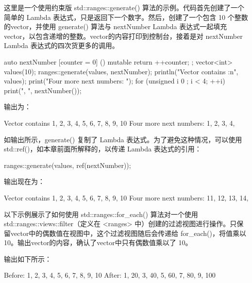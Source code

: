这里是一个使用约束版 std::ranges::generate() 算法的示例。代码首先创建了一个简单的 Lambda 表达式，只是返回下一个数字。然后，创建了一个包含 10 个整数的vector，并使用 generate() 算法与 nextNumber Lambda 表达式一起填充vector，以包含递增的整数。vector的内容打印到控制台，接着是对 nextNumber Lambda 表达式的四次货更多的调用。

\begin{cpp}
auto nextNumber { [counter = 0] () mutable { return ++counter; } };
vector<int> values(10);
ranges::generate(values, nextNumber);
println("Vector contains {:n}", values);
print("Four more next numbers: ");
for (unsigned i { 0 }; i < 4; ++i) { print("{}, ", nextNumber()); }
\end{cpp}

输出为：

\begin{shell}
Vector contains 1, 2, 3, 4, 5, 6, 7, 8, 9, 10
Four more next numbers: 1, 2, 3, 4,
\end{shell}

如输出所示，generate() 复制了 Lambda 表达式。为了避免这种情况，可以使用 std::ref()，如本章前面所解释的，以传递 Lambda 表达式的引用：

\begin{cpp}
ranges::generate(values, ref(nextNumber));
\end{cpp}

输出现在为：

\begin{shell}
Vector contains 1, 2, 3, 4, 5, 6, 7, 8, 9, 10
Four more next numbers: 11, 12, 13, 14,
\end{shell}


以下示例展示了如何使用 std::ranges::for\_each() 算法对一个使用 std::ranges::views::filter（定义在 <ranges> 中）创建的过滤视图进行操作。只保留vector中的偶数值在视图中，这个过滤视图随后会传递给 for\_each()，将值乘以 10。输出vector的内容，确认了vector中只有偶数值乘以了 10。


输出如下所示：

\begin{shell}
Before: 1, 2, 3, 4, 5, 6, 7, 8, 9, 10
After: 1, 20, 3, 40, 5, 60, 7, 80, 9, 100
\end{shell}

